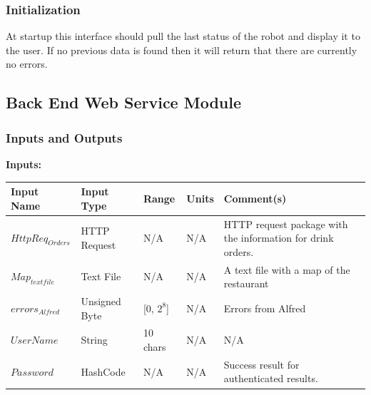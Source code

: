 \documentclass [10pt]{article}
\begin{document}

\subsubsection{Initialization}
At startup this interface should pull the last status of the robot and display it to the user. If no previous data is found then it will return that there are currently no errors.


\subsection{Back End Web Service Module}


\subsubsection{Inputs and Outputs}

\textbf{Inputs: } \\

\begin{longtable}{| p{} | p{} | p{} | p{} | p{} |}\hline 
	\rowcolor{tableCell}\textbf{Input Name} & \textbf{Input Type} & \textbf{Range} & \textbf{Units} & \textbf{Comment(s)} \\ \hline
	$ HttpReq_{Orders} $ & HTTP Request & N/A & N/A & HTTP request package with the information for drink orders. \\ \hline
	\rowcolor{tableCell}$ Map_{textfile} $ & Text File & N/A & N/A & A text file with a map of the restaurant \\ \hline
	$  errors_{Alfred} $ & Unsigned Byte & [0, $2^{8}$]& N/A & Errors from Alfred \\ \hline
	\rowcolor{tableCell}$  UserName $ & String & 10 chars & N/A & N/A\\ \hline
	$  Password $ & HashCode & N/A & N/A &  Success result for authenticated results. \\ \hline
\end{longtable}
\end{document}
